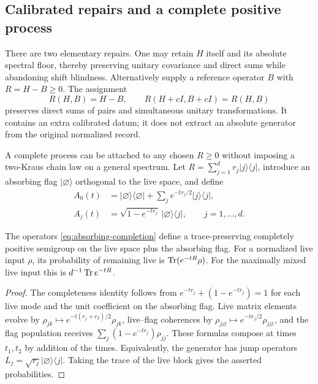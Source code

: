 \subsection{Calibrated repairs and a complete positive process}

There are two elementary repairs.
One may retain $H$ itself and its absolute spectral floor, thereby preserving
unitary covariance and direct sums while abandoning shift blindness.
Alternatively supply a reference operator $B$ with $R=H-B\geq0$.
The assignment
\begin{equation}
 R(H,B)=H-B,\qquad
 R(H+cI,B+cI)=R(H,B)
 \label{eq:calibrated-reference}
\end{equation}
preserves direct sums of pairs and simultaneous unitary transformations.
It contains an extra calibrated datum; it does not extract an absolute
generator from the original normalized record.

A complete process can be attached to any chosen $R\geq0$ without imposing a
two-Kraus chain law on a general spectrum.
Let $R=\sum_{j=1}^d r_j|j\rangle\langle j|$, introduce an absorbing flag
$|\varnothing\rangle$ orthogonal to the live space, and define
\begin{align}
 A_0(t)&=|\varnothing\rangle\langle\varnothing|
       +\sum_j e^{-tr_j/2}|j\rangle\langle j|,\nonumber\\
 A_j(t)&=\sqrt{1-e^{-tr_j}}\,
           |\varnothing\rangle\langle j|,\qquad j=1,\ldots,d .
 \label{eq:absorbing-completion}
\end{align}

\begin{proposition}
\label{prop:absorbing}
The operators \eqref{eq:absorbing-completion} define a trace-preserving
completely positive semigroup on the live space plus the absorbing flag.
For a normalized live input $\rho$, its probability of remaining live is
$\operatorname{Tr}(e^{-tR}\rho)$.
For the maximally mixed live input this is $d^{-1}\operatorname{Tr} e^{-tR}$.
\end{proposition}
\begin{proof}
The completeness identity follows from
$e^{-tr_j}+(1-e^{-tr_j})=1$ for each live mode and the unit coefficient on the
absorbing flag.
Live matrix elements evolve by
$\rho_{jk}\mapsto e^{-t(r_j+r_k)/2}\rho_{jk}$, live--flag coherences by
$\rho_{j\varnothing}\mapsto e^{-tr_j/2}\rho_{j\varnothing}$, and the flag
population receives $\sum_j(1-e^{-tr_j})\rho_{jj}$.
These formulas compose at times $t_1,t_2$ by addition of the times.
Equivalently, the generator has jump operators
$L_j=\sqrt{r_j}|\varnothing\rangle\langle j|$.
Taking the trace of the live block gives the asserted probabilities.
\end{proof}

